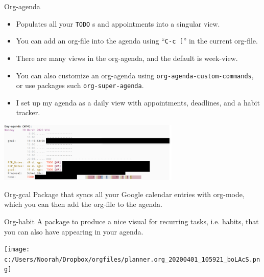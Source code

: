 \documentclass[presentation]{beamer}
\begin{document}
\begin{frame}[label={sec:orgb0aab8f},fragile]{Org-agenda}
 \small
\begin{itemize}
\item Populates all your \texttt{TODO} s and appointments into a singular view.
\item You can add an org-file into the agenda using ``\texttt{C-c [}'' in the current org-file.
\item There are many views in the org-agenda, and the default is week-view.
\item You can also customize an org-agenda using \texttt{org-agenda-custom-commands}, or use packages such \texttt{org-super-agenda}.
\item I set up my agenda as a daily view with appointments, deadlines, and a habit tracker.
\end{itemize}

\begin{center}
\includegraphics[width=0.65\textwidth]{5.png}
\end{center}
\end{frame}

\begin{frame}[label={sec:org3c05022}]{Org-gcal}
Package that syncs all your Google calendar entries with org-mode, which you can then add the org-file to the agenda.
\end{frame}

\begin{frame}[label={sec:orgb456ecb}]{Org-habit}
A package to produce a nice visual for recurring tasks, i.e. habits, that you can also have appearing in your agenda.

\begin{center}
\texttt{[image: c:/Users/Noorah/Dropbox/orgfiles/planner.org\_20200401\_105921\_boLAcS.png]}
\end{center}
\end{frame}
\end{document}
